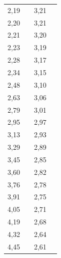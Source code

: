 \documentclass[a4paper,12pt]{report}
\begin{document}
\begin{table}[h!]
\begin{tabular}{|c|c|c|c|}
2,19      &                        & 3,21 &                        \\ \cline{1-1} \cline{3-3}
2,20      &                        & 3,21 &                        \\ \cline{1-1} \cline{3-3}
2,21      &                        & 3,20 &                        \\ \cline{1-1} \cline{3-3}
2,23      &                        & 3,19 &                        \\ \cline{1-1} \cline{3-3}
2,28      &                        & 3,17 &                        \\ \cline{1-1} \cline{3-3}
2,34      &                        & 3,15 &                        \\ \cline{1-1} \cline{3-3}
2,48      &                        & 3,10 &                        \\ \cline{1-1} \cline{3-3}
2,63      &                        & 3,06 &                        \\ \cline{1-1} \cline{3-3}
2,79      &                        & 3,01 &                        \\ \cline{1-1} \cline{3-3}
2,95      &                        & 2,97 &                        \\ \cline{1-1} \cline{3-3}
3,13      &                        & 2,93 &                        \\ \cline{1-1} \cline{3-3}
3,29      &                        & 2,89 &                        \\ \cline{1-1} \cline{3-3}
3,45      &                        & 2,85 &                        \\ \cline{1-1} \cline{3-3}
3,60      &                        & 2,82 &                        \\ \cline{1-1} \cline{3-3}
3,76      &                        & 2,78 &                        \\ \cline{1-1} \cline{3-3}
3,91      &                        & 2,75 &                        \\ \cline{1-1} \cline{3-3}
4,05      &                        & 2,71 &                        \\ \cline{1-1} \cline{3-3}
4,19      &                        & 2,68 &                        \\ \cline{1-1} \cline{3-3}
4,32      &                        & 2,64 &                        \\ \cline{1-1} \cline{3-3}
4,45      &                        & 2,61 &                        \\ \cline{1-1} \cline{3-3}

\end{tabular}
\end{table}
\end{document}
